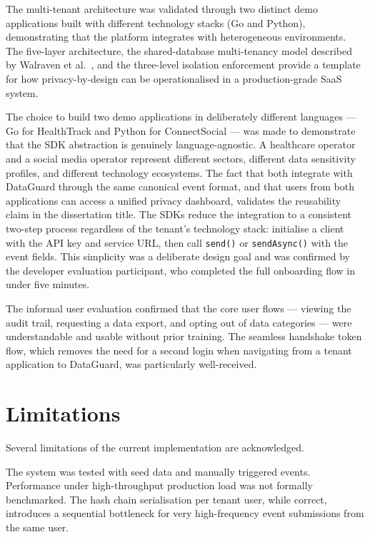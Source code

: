 \documentclass[a4paper,12pt,onecolumn]{report}
\begin{document}
The multi-tenant architecture was validated through two distinct demo applications built with different technology stacks (Go and Python), demonstrating that the platform integrates with heterogeneous environments.
The five-layer architecture, the shared-database multi-tenancy model described by Walraven et al.\ \cite{walraven2011}, and the three-level isolation enforcement provide a template for how privacy-by-design \cite{cavoukian2009} can be operationalised in a production-grade SaaS system.

The choice to build two demo applications in deliberately different languages --- Go for HealthTrack and Python for ConnectSocial --- was made to demonstrate that the SDK abstraction is genuinely language-agnostic.
A healthcare operator and a social media operator represent different sectors, different data sensitivity profiles, and different technology ecosystems.
The fact that both integrate with DataGuard through the same canonical event format, and that users from both applications can access a unified privacy dashboard, validates the reusability claim in the dissertation title.
The SDKs reduce the integration to a consistent two-step process regardless of the tenant's technology stack: initialise a client with the API key and service URL, then call \texttt{send()} or \texttt{sendAsync()} with the event fields.
This simplicity was a deliberate design goal and was confirmed by the developer evaluation participant, who completed the full onboarding flow in under five minutes.

The informal user evaluation confirmed that the core user flows --- viewing the audit trail, requesting a data export, and opting out of data categories --- were understandable and usable without prior training.
The seamless handshake token flow, which removes the need for a second login when navigating from a tenant application to DataGuard, was particularly well-received.

\section{Limitations}

Several limitations of the current implementation are acknowledged.

The system was tested with seed data and manually triggered events.
Performance under high-throughput production load was not formally benchmarked.
The hash chain serialisation per tenant user, while correct, introduces a sequential bottleneck for very high-frequency event submissions from the same user.
\end{document}

